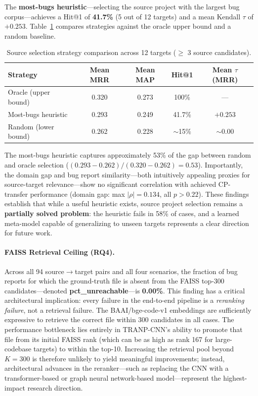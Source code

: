 \documentclass[12pt,table,xcdraw]{article}
\begin{document}
The \textbf{most-bugs heuristic}---selecting the source project with the largest bug corpus---achieves a Hit@1 of \textbf{41.7\%} (5 out of 12 targets) and a mean Kendall $\tau$ of \textbf{$+0.253$}. Table~\ref{tab:source_selection} compares strategies against the oracle upper bound and a random baseline.

\begin{table}[h]
\centering
\caption{Source selection strategy comparison across 12 targets ($\geq$ 3 source candidates).}
\label{tab:source_selection}
\begin{tabular}{|l|c|c|c|c|}
\hline
\textbf{Strategy} & \textbf{Mean MRR} & \textbf{Mean MAP} & \textbf{Hit@1} & \textbf{Mean $\tau$ (MRR)} \\ \hline
Oracle (upper bound) & 0.320 & 0.273 & 100\% & --- \\ \hline
Most-bugs heuristic  & 0.293 & 0.249 & 41.7\% & $+0.253$ \\ \hline
Random (lower bound) & 0.262 & 0.228 & $\sim$15\% & $\sim$0.00 \\ \hline
\end{tabular}
\end{table}

The most-bugs heuristic captures approximately 53\% of the gap between random and oracle selection ($(0.293 - 0.262) / (0.320 - 0.262) = 0.53$). Importantly, the domain gap and bug report similarity---both intuitively appealing proxies for source-target relevance---show no significant correlation with achieved CP-transfer performance (domain gap: max $|\rho| = 0.134$, all $p > 0.22$). These findings establish that while a useful heuristic exists, source project selection remains a \textbf{partially solved problem}: the heuristic fails in 58\% of cases, and a learned meta-model capable of generalizing to unseen targets represents a clear direction for future work.

\paragraph{FAISS Retrieval Ceiling (RQ4).}
Across all 94 source$\rightarrow$target pairs and all four scenarios, the fraction of bug reports for which the ground-truth file is absent from the FAISS top-300 candidates---denoted \textbf{pct\_unreachable}---is \textbf{0.00\%}. This finding has a critical architectural implication: every failure in the end-to-end pipeline is a \textit{reranking failure}, not a retrieval failure. The BAAI/bge-code-v1 embeddings are sufficiently expressive to retrieve the correct file within 300 candidates in all cases. The performance bottleneck lies entirely in TRANP-CNN's ability to promote that file from its initial FAISS rank (which can be as high as rank 167 for large-codebase targets) to within the top-10. Increasing the retrieval pool beyond $K = 300$ is therefore unlikely to yield meaningful improvements; instead, architectural advances in the reranker---such as replacing the CNN with a transformer-based or graph neural network-based model---represent the highest-impact research direction.
\end{document}
